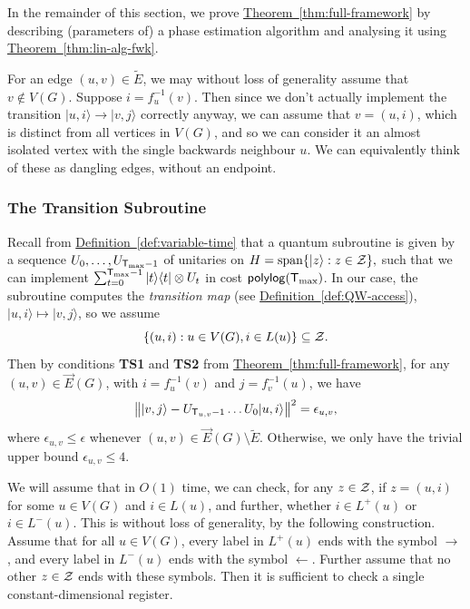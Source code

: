 \documentclass{article}
\newcommand{\thm}[1]{\hyperref[thm:#1]{Theorem~\ref*{thm:#1}}}
\newcommand{\defin}[1]{\hyperref[def:#1]{Definition~\ref*{def:#1}}}
\def\ket#1{{\lvert}#1\rangle}
\def\bra#1{{\langle}#1\rvert}
\renewcommand{\>}{\rangle}
\newcommand{\<}{\langle}
\renewcommand{\(}{\left(}
\renewcommand{\)}{\right)}
\def\norm#1{\left\| #1 \right\|}
\begin{document}
In the remainder of this section, we prove \thm{full-framework} by describing (parameters of) a phase estimation algorithm and analysing it using \thm{lin-alg-fwk}. 

\begin{remark}\label{rem:orphan-vertices}
For an edge $(u,v)\in\tilde{E}$, we may without loss of generality assume that $v\not\in V(G)$. Suppose $i=f_u^{-1}(v)$. Then since we don't actually implement the transition $\ket{u,i}\rightarrow\ket{v,j}$ correctly anyway, we can assume that $v=(u,i)$, which is distinct from all vertices in $V(G)$, and so we can consider it an almost isolated vertex with the single backwards neighbour $u$. We can equivalently think of these as dangling edges, without an endpoint.
\end{remark}


\subsubsection{The Transition Subroutine}\label{sec:fwk-transitions}

Recall from \defin{variable-time} that a quantum subroutine is given by a sequence $U_0,\dots,U_{{\sf T}_{\max}-1}$ of unitaries on
$H=\mathrm{span}\{\ket{z}:z\in{\cal Z}\},$
such that we can implement $\sum_{t=0}^{{\sf T}_{\max}-1}\ket{t}\bra{t}\otimes U_t$ in cost ${\sf polylog}({\sf T}_{\max})$. 
In our case, the subroutine computes the \emph{transition map} (see \defin{QW-access}), $\ket{u,i}\mapsto \ket{v,j}$, so we assume 
$$\{(u,i): u\in V(G),i\in L(u)\}\subseteq{\cal Z}.$$
Then by conditions \textbf{TS1} and \textbf{TS2} from \thm{full-framework}, for any $(u,v)\in \overrightarrow{E}(G)$, with $i=f_u^{-1}(v)$ and $j=f_v^{-1}(u)$, we have  
\begin{equation}
\norm{\ket{v,j} - U_{{\sf T}_{u,v}-1}\dots U_0\ket{u,i}}^2 = \epsilon_{u,v},\label{eq:fwk-alg-error}
\end{equation}
where $\epsilon_{u,v}\leq \epsilon$ whenever $(u,v)\in\overrightarrow{E}(G)\setminus\tilde{E}$. Otherwise, we only have the trivial upper bound $\epsilon_{u,v}\leq 4$.  

We will assume that in $O(1)$ time, we can check, for any $z\in {\cal Z}$, if $z=(u,i)$ for some $u\in V(G)$ and $i\in L(u)$, and further, whether $i\in L^+(u)$ or $i\in L^-(u)$. This is without loss of generality, by the following construction. Assume that for all $u\in V(G)$, every label in $L^+(u)$ ends with the symbol $\rightarrow$, and every label in $L^-(u)$ ends with the symbol $\leftarrow$. Further assume that no other $z\in {\cal Z}$ ends with these symbols. Then it is sufficient to check a single constant-dimensional register.
\end{document}
